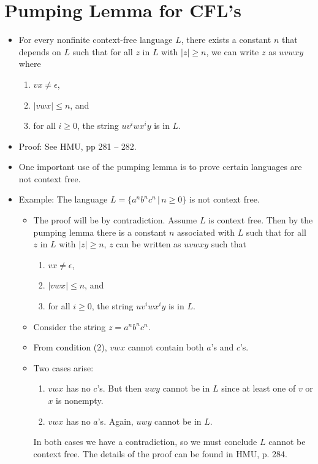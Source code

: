 \documentclass[]{article}
\begin{document}
\section{Pumping Lemma for CFL's}
  \begin{itemize}
    \item For every nonfinite context-free language $L$, there exists a constant 
    $n$ that depends on $L$ such that for all $z$ in $L$ with $|z| \geq n$, we can 
    write $z$ as $uvwxy$ where
      \begin{enumerate}
        \item $vx \neq \epsilon$,
        \item $|vwx| \leq n$, and
        \item for all $i \geq 0$, the string $uv^iwx^iy$ is in $L$.
      \end{enumerate}
    \item Proof: See HMU, pp 281 -- 282.
    \item One important use of the pumping lemma is to prove certain languages are 
    not context free.
    \item Example: The language $L = \{a^nb^nc^n \, | \, n \geq 0 \}$ is not 
    context free.
      \begin{itemize}
        \item The proof will be by contradiction. Assume $L$ is context free. Then 
        by the pumping lemma there is a constant $n$ associated with $L$ such that 
        for all $z$ in $L$ with $|z| \geq n$, $z$ can be written as $uvwxy$ such 
        that
          \begin{enumerate}
            \item $vx \neq \epsilon$,
            \item $|vwx| \leq n$, and 
            \item for all $i \geq 0$, the string $uv^iwx^iy$ is in $L$.
          \end{enumerate}
        \item Consider the string $z = a^nb^nc^n$.
        \item From condition (2), $vwx$ cannot contain both $a$'s and $c$'s.
        \item Two cases arise:
          \begin{enumerate}
            \item $vwx$ has no $c$'s. But then $uwy$ cannot be in $L$ since at 
            least one of $v$ or $x$ is nonempty.
            \item $vwx$ has no $a$'s. Again, $uwy$ cannot be in $L$.
          \end{enumerate}
        In both cases we have a contradiction, so we must conclude $L$ cannot be 
        context free. The details of the proof can be found in HMU, p. 284.
      \end{itemize}
  \end{itemize}
\end{document}
